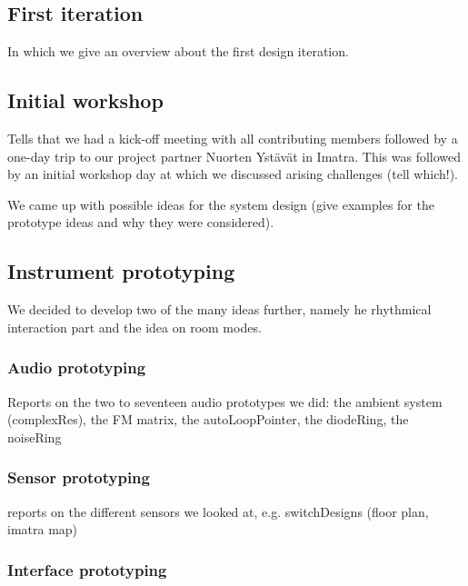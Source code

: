 \documentclass{chi-ext}
\begin{document}
\begin{multicols}{2}
\section{First iteration}
\label{sec:first_iteration}

In which we give an overview about the first design iteration.

\subsection{Initial workshop}
\label{sub:initial_workshop}

Tells that we had a kick-off meeting with all contributing members followed by a one-day trip to our project partner Nuorten Ystävät in Imatra.
This was followed by an initial workshop day at which we discussed arising challenges (tell which!).

We came up with possible ideas for the system design (give examples for the prototype ideas and why they were considered).


\subsection{Instrument prototyping}
\label{sub:instrument_prototyping}

We decided to develop two of the many ideas further, namely he rhythmical interaction part and the idea on room modes.

\subsubsection{Audio prototyping}
\label{ssub:audio_prototyping}

Reports on the two to seventeen audio prototypes we did: 
the ambient system (complexRes), the FM matrix, the autoLoopPointer, the diodeRing, the noiseRing

\subsubsection{Sensor prototyping}
\label{sub:sensor_prototyping}
reports on the different sensors we looked at, e.g. switchDesigns (floor plan, imatra map)


\subsubsection{Interface prototyping}
\label{ssub:interface_prototyping}


\end{multicols}
\end{document}
